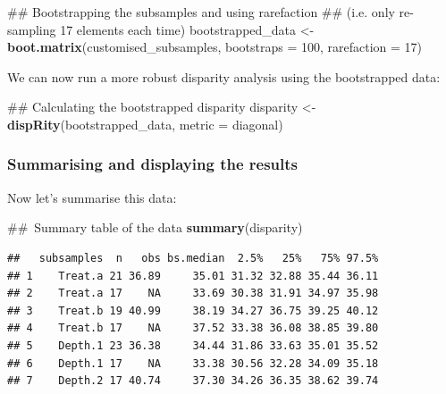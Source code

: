 \documentclass[]{book}
\newenvironment{Shaded}{\begin{snugshade}}{\end{snugshade}}
\newcommand{\KeywordTok}[1]{\textcolor[rgb]{0.13,0.29,0.53}{\textbf{#1}}}
\newcommand{\DataTypeTok}[1]{\textcolor[rgb]{0.13,0.29,0.53}{#1}}
\newcommand{\DecValTok}[1]{\textcolor[rgb]{0.00,0.00,0.81}{#1}}
\newcommand{\StringTok}[1]{\textcolor[rgb]{0.31,0.60,0.02}{#1}}
\newcommand{\NormalTok}[1]{#1}
\theoremstyle{definition}
\theoremstyle{definition}
\theoremstyle{remark}
\begin{document}
\begin{Shaded}
\begin{Highlighting}[]
\NormalTok{## Bootstrapping the subsamples and using rarefaction}
\NormalTok{## (i.e. only re-sampling 17 elements each time)}
\NormalTok{bootstrapped_data <-}\StringTok{ }\KeywordTok{boot.matrix}\NormalTok{(customised_subsamples, }\DataTypeTok{bootstraps =} \DecValTok{100}\NormalTok{,}
                                 \DataTypeTok{rarefaction =} \DecValTok{17}\NormalTok{)}
\end{Highlighting}
\end{Shaded}

We can now run a more robust disparity analysis using the bootstrapped
data:

\begin{Shaded}
\begin{Highlighting}[]
\NormalTok{## Calculating the bootstrapped disparity}
\NormalTok{disparity <-}\StringTok{ }\KeywordTok{dispRity}\NormalTok{(bootstrapped_data, }\DataTypeTok{metric =}\NormalTok{ diagonal)}
\end{Highlighting}
\end{Shaded}

\subsubsection{Summarising and displaying the
results}\label{summarising-and-displaying-the-results}

Now let's summarise this data:

\begin{Shaded}
\begin{Highlighting}[]
\NormalTok{## Summary table of the data}
\KeywordTok{summary}\NormalTok{(disparity)}
\end{Highlighting}
\end{Shaded}

\begin{verbatim}
##   subsamples  n   obs bs.median  2.5%   25%   75% 97.5%
## 1    Treat.a 21 36.89     35.01 31.32 32.88 35.44 36.11
## 2    Treat.a 17    NA     33.69 30.38 31.91 34.97 35.98
## 3    Treat.b 19 40.99     38.19 34.27 36.75 39.25 40.12
## 4    Treat.b 17    NA     37.52 33.38 36.08 38.85 39.80
## 5    Depth.1 23 36.38     34.44 31.86 33.63 35.01 35.52
## 6    Depth.1 17    NA     33.38 30.56 32.28 34.09 35.18
## 7    Depth.2 17 40.74     37.30 34.26 36.35 38.62 39.74
\end{verbatim}
\end{document}
